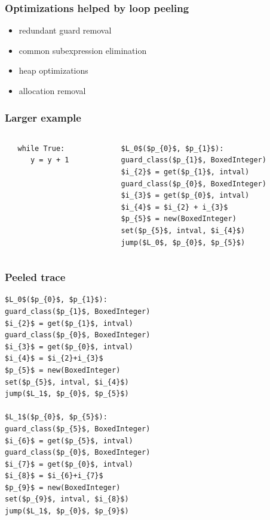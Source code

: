 \documentclass[utf8x]{beamer}
\begin{document}
\begin{frame}
  \frametitle{Optimizations helped by loop peeling}
  \begin{itemize}
      \item redundant guard removal
      \item common subexpression elimination
      \item heap optimizations
      \item allocation removal
  \end{itemize}
\end{frame}


\begin{frame}[fragile]
  \frametitle{Larger example}
    \begin{columns}
    \begin{column}{0.5\textwidth}
  \begin{lstlisting}
   while True:
      y = y + 1
  \end{lstlisting}
  \end{column}
    \pause
    \begin{column}{0.5\textwidth}
\begin{lstlisting}[mathescape]
$L_0$($p_{0}$, $p_{1}$):
guard_class($p_{1}$, BoxedInteger)
$i_{2}$ = get($p_{1}$, intval)
guard_class($p_{0}$, BoxedInteger)
$i_{3}$ = get($p_{0}$, intval)
$i_{4}$ = $i_{2} + i_{3}$
$p_{5}$ = new(BoxedInteger)
set($p_{5}$, intval, $i_{4}$)
jump($L_0$, $p_{0}$, $p_{5}$)
\end{lstlisting}
  \end{column}
  \end{columns}
\end{frame}


\begin{frame}[fragile]
  \frametitle{Peeled trace}
\begin{lstlisting}[mathescape]
$L_0$($p_{0}$, $p_{1}$):
guard_class($p_{1}$, BoxedInteger)
$i_{2}$ = get($p_{1}$, intval)
guard_class($p_{0}$, BoxedInteger)
$i_{3}$ = get($p_{0}$, intval)
$i_{4}$ = $i_{2}+i_{3}$
$p_{5}$ = new(BoxedInteger)
set($p_{5}$, intval, $i_{4}$)
jump($L_1$, $p_{0}$, $p_{5}$)

$L_1$($p_{0}$, $p_{5}$):
guard_class($p_{5}$, BoxedInteger)
$i_{6}$ = get($p_{5}$, intval)
guard_class($p_{0}$, BoxedInteger)
$i_{7}$ = get($p_{0}$, intval)
$i_{8}$ = $i_{6}+i_{7}$
$p_{9}$ = new(BoxedInteger)
set($p_{9}$, intval, $i_{8}$)
jump($L_1$, $p_{0}$, $p_{9}$)
\end{lstlisting}
\end{frame}
\end{document}
